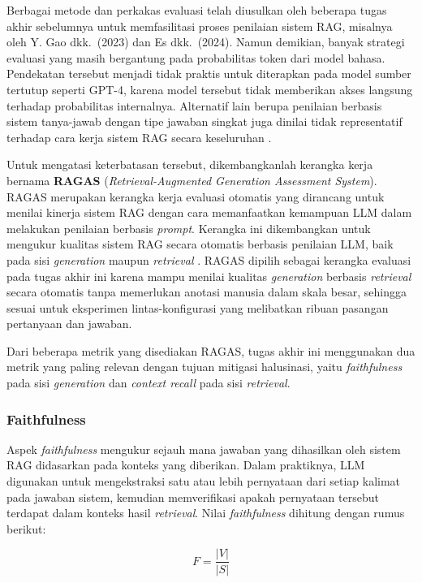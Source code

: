 Berbagai metode dan perkakas evaluasi telah diusulkan oleh beberapa tugas akhir sebelumnya untuk memfasilitasi proses penilaian sistem RAG, misalnya oleh Y. Gao dkk.\ (2023) dan Es dkk.\ (2024). Namun demikian, banyak strategi evaluasi yang masih bergantung pada probabilitas token dari model bahasa. Pendekatan tersebut menjadi tidak praktis untuk diterapkan pada model sumber tertutup seperti GPT-4, karena model tersebut tidak memberikan akses langsung terhadap probabilitas internalnya. Alternatif lain berupa penilaian berbasis sistem tanya-jawab dengan tipe jawaban singkat juga dinilai tidak representatif terhadap cara kerja sistem RAG secara keseluruhan \parencite{gao2023rag-eval}.

Untuk mengatasi keterbatasan tersebut, dikembangkanlah kerangka kerja bernama \textbf{RAGAS} (\textit{Retrieval-Augmented Generation Assessment System}). RAGAS merupakan kerangka kerja evaluasi otomatis yang dirancang untuk menilai kinerja sistem RAG dengan cara memanfaatkan kemampuan LLM dalam melakukan penilaian berbasis \textit{prompt}. Kerangka ini dikembangkan untuk mengukur kualitas sistem RAG secara otomatis berbasis penilaian LLM, baik pada sisi \textit{generation} maupun \textit{retrieval} \parencite{es2024ragas}. RAGAS dipilih sebagai kerangka evaluasi pada tugas akhir ini karena mampu menilai kualitas \textit{generation} berbasis \textit{retrieval} secara otomatis tanpa memerlukan anotasi manusia dalam skala besar, sehingga sesuai untuk eksperimen lintas-konfigurasi yang melibatkan ribuan pasangan pertanyaan dan jawaban.

Dari beberapa metrik yang disediakan RAGAS, tugas akhir ini menggunakan dua metrik yang paling relevan dengan tujuan mitigasi halusinasi, yaitu \textit{faithfulness} pada sisi \textit{generation} dan \textit{context recall} pada sisi \textit{retrieval}.

\subsubsection{Faithfulness}

Aspek \textit{faithfulness} mengukur sejauh mana jawaban yang dihasilkan oleh sistem RAG didasarkan pada konteks yang diberikan. Dalam praktiknya, LLM digunakan untuk mengekstraksi satu atau lebih pernyataan dari setiap kalimat pada jawaban sistem, kemudian memverifikasi apakah pernyataan tersebut terdapat dalam konteks hasil \textit{retrieval}. Nilai \textit{faithfulness} dihitung dengan rumus berikut:

\begin{equation}
F = \frac{|V|}{|S|}
\end{equation}

